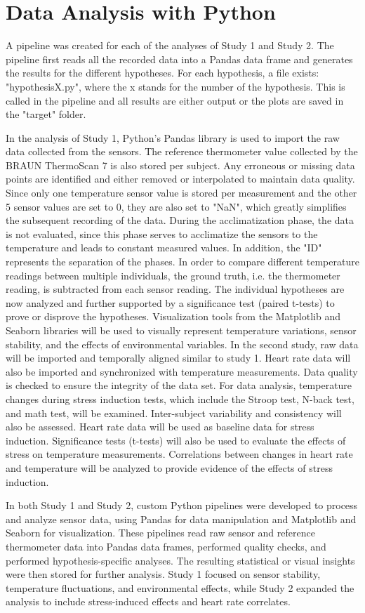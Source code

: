 \section{Data Analysis with Python}
A pipeline was created for each of the analyses of Study 1 and Study 2. 
The pipeline first reads all the recorded data into a Pandas data frame and generates the results for the different hypotheses.
For each hypothesis, a file exists: "hypothesisX.py", where the x stands for the number of the hypothesis. 
This is called in the pipeline and all results are either output or the plots are saved in the "target" folder.

In the analysis of Study 1, Python's Pandas library is used to import the raw data collected from the sensors. 
The reference thermometer value collected by the BRAUN ThermoScan 7 is also stored per subject. 
Any erroneous or missing data points are identified and either removed or interpolated to maintain data quality. 
Since only one temperature sensor value is stored per measurement and the other 5 sensor values are set to 0, they are also set to "NaN", which greatly simplifies the subsequent recording of the data.
During the acclimatization phase, the data is not evaluated, since this phase serves to acclimatize the sensors to the temperature and leads to constant measured values.
In addition, the "ID" represents the separation of the phases.
In order to compare different temperature readings between multiple individuals, the ground truth, i.e. the thermometer reading, is subtracted from each sensor reading.
The individual hypotheses are now analyzed and further supported by a significance test (paired t-tests) to prove or disprove the hypotheses.
Visualization tools from the Matplotlib and Seaborn libraries will be used to visually represent temperature variations, sensor stability, and the effects of environmental variables.
In the second study, raw data will be imported and temporally aligned similar to study 1. Heart rate data will also be imported and synchronized with temperature measurements. 
Data quality is checked to ensure the integrity of the data set.
For data analysis, temperature changes during stress induction tests, which include the Stroop test, N-back test, and math test, will be examined. 
Inter-subject variability and consistency will also be assessed. 
Heart rate data will be used as baseline data for stress induction. 
Significance tests (t-tests) will also be used to evaluate the effects of stress on temperature measurements. 
Correlations between changes in heart rate and temperature will be analyzed to provide evidence of the effects of stress induction. 

In both Study 1 and Study 2, custom Python pipelines were developed to process and analyze sensor data, using Pandas for data manipulation and Matplotlib and Seaborn for visualization. These pipelines read raw sensor and reference thermometer data into Pandas data frames, performed quality checks, and performed hypothesis-specific analyses. The resulting statistical or visual insights were then stored for further analysis. Study 1 focused on sensor stability, temperature fluctuations, and environmental effects, while Study 2 expanded the analysis to include stress-induced effects and heart rate correlates.